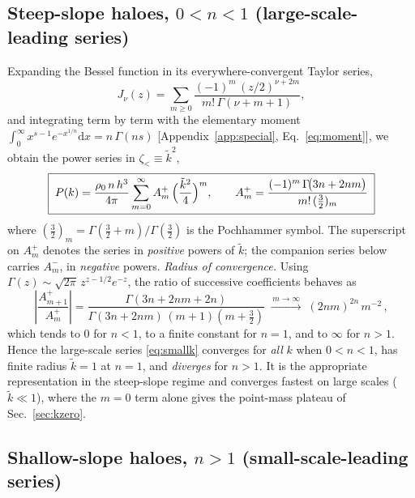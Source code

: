 \documentclass[aps,prd,onecolumn]{revtex4-2}
\newcommand{\kt}{\tilde{k}}          %
\begin{document}
\subsection{Steep-slope haloes, $0<n<1$ (large-scale-leading series)}
\label{sec:smallk}

Expanding the Bessel function in its everywhere-convergent Taylor series,
\begin{equation}
J_\nu(z)=\sum_{m\ge0}\frac{(-1)^m\,(z/2)^{\nu+2m}}{m!\,\Gamma(\nu+m+1)},
\end{equation}
and integrating term by term with the elementary moment
$\int_0^\infty x^{s-1}e^{-x^{1/n}}\mathrm{d}x=n\,\Gamma(ns)$
[Appendix~\ref{app:special}, Eq.~\eqref{eq:moment}], we obtain the power
series in $\zeta_<\equiv\kt^{2}$,
\begin{equation}
\boxed{\;
P(k)=\frac{\rho_0\,n\,h^3}{4\pi}
\sum_{m=0}^{\infty} A_m^{+}\,\Bigl(\frac{\kt^{2}}{4}\Bigr)^{m},
\qquad
A_m^{+}=\frac{(-1)^m\,\Gamma\!\bigl(3n+2nm\bigr)}{m!\,(\tfrac32)_m}\;}
\label{eq:smallk}
\end{equation}
where $(\tfrac32)_m=\Gamma(\tfrac32+m)/\Gamma(\tfrac32)$ is the Pochhammer
symbol.  The superscript on $A_m^{+}$ denotes the series in
\emph{positive} powers of $\kt$; the companion series below carries
$A_m^{-}$, in \emph{negative} powers.  \emph{Radius of convergence.}  Using
$\Gamma(z)\sim\sqrt{2\pi}\,z^{z-1/2}e^{-z}$, the ratio of successive
coefficients behaves as
\begin{equation}
\left|\frac{A_{m+1}^{+}}{A_{m}^{+}}\right|
=\frac{\Gamma(3n+2nm+2n)}{\Gamma(3n+2nm)\,(m+1)(m+\tfrac32)}
\;\xrightarrow{\,m\to\infty\,}\;
(2nm)^{2n}\,m^{-2}\,,
\end{equation}
which tends to $0$ for $n<1$, to a finite constant for $n=1$, and to
$\infty$ for $n>1$.  Hence the large-scale series \eqref{eq:smallk}
converges for \emph{all} $k$ when $0<n<1$, has finite radius $\kt=1$ at
$n=1$, and \emph{diverges} for $n>1$.  It is the appropriate
representation in the steep-slope regime and converges fastest on large
scales ($\kt\ll1$), where the $m=0$ term alone gives the point-mass
plateau of Sec.~\ref{sec:kzero}.

\subsection{Shallow-slope haloes, $n>1$ (small-scale-leading series)}
\label{sec:largek}
\end{document}
